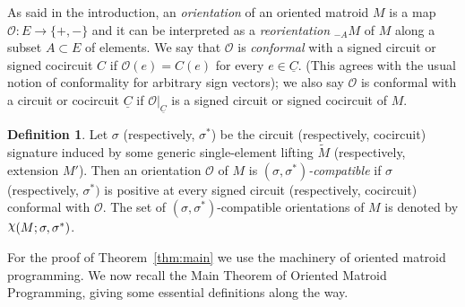 \documentclass[12pt]{amsart}
\numberwithin{equation}{section}
\theoremstyle{definition}
\newtheorem{definition}[theorem]{Definition}
\newcommand{\Ocal}{{\mathcal O}}
\DeclareRobustCommand{\rchi}{{\mathpalette\irchi\relax}}
\newcommand{\irchi}[2]{\raisebox{\depth}{$#1\chi$}}
\newcommand{\chiho}[1]{\todo[color=green!30]{\rm #1 \\ \hfill --- Ch.}}
\begin{document}
As said in the introduction, an {\em orientation} of an oriented matroid $M$ is a map $\Ocal:E\rightarrow\{+,-\}$ and it can be interpreted  as a {\em reorientation} $_{-A}M$ of $M$ along a subset $A\subset E$ of elements.
We say that $\Ocal$ is {\em conformal} with a signed circuit or signed cocircuit $C$ if $\Ocal(e)=C(e)$ for every $e\in\underline{C}$. (This agrees with the usual notion of conformality for arbitrary sign vectors); we also say $\Ocal$ is conformal with a circuit or cocircuit $\underline{C}$ if $\Ocal|_{\underline{C}}$ is a signed circuit or signed cocircuit of $M$.

\begin{definition} \label{def:CCMO}
Let $\sigma$ (respectively, $\sigma^*$) be the circuit (respectively, cocircuit) signature induced by some generic single-element lifting $\widetilde{M}$ (respectively, extension $M'$). Then an orientation $\Ocal$ of $M$ is {\em $(\sigma,\sigma^*)$-compatible} if $\sigma$ (respectively, $\sigma^*)$ is positive at every signed circuit (respectively, cocircuit) conformal with $\Ocal$.
The set of $(\sigma,\sigma^*)$-compatible orientations of $M$ is denoted by $\rchi(M;\sigma,\sigma^*)$.
\end{definition}


For the proof of Theorem~\ref{thm:main} we use the machinery of oriented matroid programming. We now recall the Main Theorem of Oriented Matroid Programming, giving some essential definitions along the way.
\end{document}
